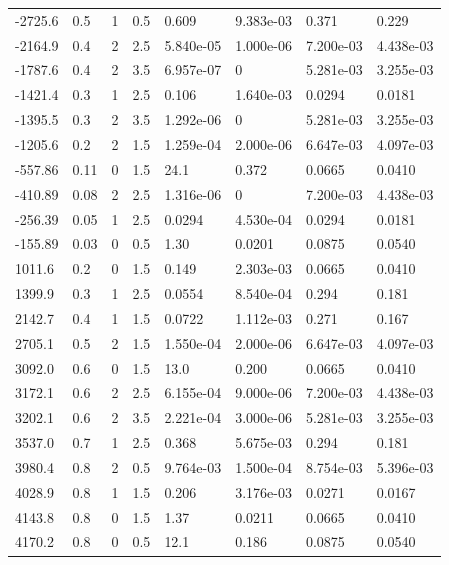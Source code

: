 \documentclass[preview]{standalone}
\begin{document}
{{\begin{tabular}{L{1.2cm}C{1.2cm} C{0.3cm}C{0.5cm} C{1.4cm}C{1.4cm} C{1.4cm}C{1.4cm}}
  -2725.6  &   0.5  & 1     & 0.5 &  0.609  & 9.383e-03  & 0.371 &  0.229   \\ 
  -2164.9  &   0.4  & 2     & 2.5 &  5.840e-05  & 1.000e-06  & 7.200e-03 &  4.438e-03   \\ 
  -1787.6  &   0.4  & 2     & 3.5 &  6.957e-07  & 0  & 5.281e-03 &  3.255e-03   \\ 
  -1421.4  &   0.3  & 1     & 2.5 &  0.106  & 1.640e-03  & 0.0294 &  0.0181   \\ 
  -1395.5  &   0.3  & 2     & 3.5 &  1.292e-06  & 0  & 5.281e-03 &  3.255e-03   \\ 
  -1205.6  &   0.2  & 2     & 1.5 &  1.259e-04  & 2.000e-06  & 6.647e-03 &  4.097e-03   \\ 
  -557.86  &  0.11  & 0     & 1.5 &  24.1  & 0.372  & 0.0665 &  0.0410   \\ 
  -410.89  &  0.08  & 2     & 2.5 &  1.316e-06  & 0  & 7.200e-03 &  4.438e-03   \\ 
  -256.39  &  0.05  & 1     & 2.5 &  0.0294  & 4.530e-04  & 0.0294 &  0.0181   \\ 
  -155.89  &  0.03  & 0     & 0.5 &  1.30  & 0.0201  & 0.0875 &  0.0540   \\ 
  1011.6  &   0.2  & 0     & 1.5 &  0.149  & 2.303e-03  & 0.0665 &  0.0410   \\ 
  1399.9  &   0.3  & 1     & 2.5 &  0.0554  & 8.540e-04  & 0.294 &  0.181   \\ 
  2142.7  &   0.4  & 1     & 1.5 &  0.0722  & 1.112e-03  & 0.271 &  0.167   \\ 
  2705.1  &   0.5  & 2     & 1.5 &  1.550e-04  & 2.000e-06  & 6.647e-03 &  4.097e-03   \\ 
  3092.0  &   0.6  & 0     & 1.5 &  13.0  & 0.200  & 0.0665 &  0.0410   \\ 
  3172.1  &   0.6  & 2     & 2.5 &  6.155e-04  & 9.000e-06  & 7.200e-03 &  4.438e-03   \\ 
  3202.1  &   0.6  & 2     & 3.5 &  2.221e-04  & 3.000e-06  & 5.281e-03 &  3.255e-03   \\ 
  3537.0  &   0.7  & 1     & 2.5 &  0.368  & 5.675e-03  & 0.294 &  0.181   \\ 
  3980.4  &   0.8  & 2     & 0.5 &  9.764e-03  & 1.500e-04  & 8.754e-03 &  5.396e-03   \\ 
  4028.9  &   0.8  & 1     & 1.5 &  0.206  & 3.176e-03  & 0.0271 &  0.0167   \\ 
  4143.8  &   0.8  & 0     & 1.5 &  1.37  & 0.0211  & 0.0665 &  0.0410   \\ 
  4170.2  &   0.8  & 0     & 0.5 &  12.1  & 0.186  & 0.0875 &  0.0540   \\ 

\end{tabular}}}
\end{document}
